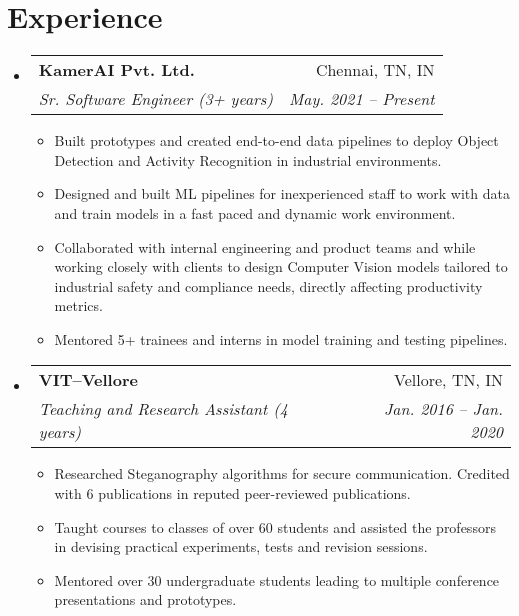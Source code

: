 \documentclass[a4paper,11pt]{article}
\makeatletter
\newcommand{\resumeSubheading}[4]{
  \vspace{-1pt}\item
    \begin{tabular*}{0.97\textwidth}[t]{l@{\extracolsep{\fill}}r}
      \textbf{#1} & #2 \\
      \textit{\small#3} & \textit{\small #4} \\
    \end{tabular*}\vspace{-5pt}
}
\newcommand{\resumeSubHeadingListStart}{\begin{itemize}[leftmargin=*]}
\newcommand{\resumeSubHeadingListEnd}{\end{itemize}}
\makeatother
\begin{document}
\section{Experience}
  \resumeSubHeadingListStart
    \resumeSubheading
      {KamerAI Pvt. Ltd.}{Chennai, TN, IN}
      {Sr. Software Engineer (3+ years)}{May. 2021 -- Present}
      \begin{itemize}[leftmargin=*, itemsep = -2pt]
      \item {Built prototypes and created end-to-end data pipelines to deploy Object Detection and Activity Recognition in industrial environments.}
      \item {Designed and built ML pipelines for inexperienced staff to work with data and train models in a fast paced and dynamic work environment.}
	    \item {Collaborated with internal engineering and product teams and while working closely with clients to design Computer Vision models tailored to industrial safety and compliance needs, directly affecting productivity metrics.}
	    \item {Mentored 5+ trainees and interns in model training and testing pipelines.}
      \end{itemize}
    \resumeSubheading
      {VIT--Vellore}{Vellore, TN, IN}
      {Teaching and Research Assistant (4 years)}{Jan. 2016 -- Jan. 2020}
      \begin{itemize}[leftmargin=*, itemsep = -2pt]
        \item {Researched Steganography algorithms for secure communication. Credited with 6 publications in reputed peer-reviewed publications.}
        \item {Taught courses to classes of over 60 students and assisted the professors in devising practical experiments, tests and revision sessions.}
        \item {Mentored over 30 undergraduate students leading to multiple conference presentations and prototypes.}
      \end{itemize}
  \resumeSubHeadingListEnd

\end{document}
